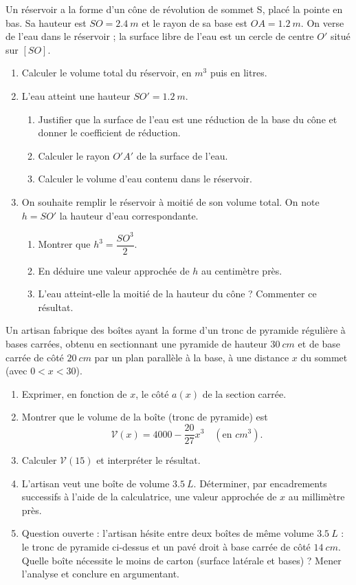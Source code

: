 \documentclass[11pt]{article}
\begin{document}
\begin{exercice}
Un réservoir a la forme d'un cône de révolution de sommet S, placé la pointe en bas. Sa hauteur est $SO = \SI{2,4}{m}$ et le rayon de sa base est $OA = \SI{1,2}{m}$. On verse de l'eau dans le réservoir ; la surface libre de l'eau est un cercle de centre $O'$ situé sur $[SO]$.
\begin{enumerate}
\item Calculer le volume total du réservoir, en $\si{m^3}$ puis en litres.
\item L'eau atteint une hauteur $SO' = \SI{1,2}{m}$.
\begin{enumerate}
\item Justifier que la surface de l'eau est une réduction de la base du cône et donner le coefficient de réduction.
\item Calculer le rayon $O'A'$ de la surface de l'eau.
\item Calculer le volume d'eau contenu dans le réservoir.
\end{enumerate}
\item On souhaite remplir le réservoir à moitié de son volume total. On note $h = SO'$ la hauteur d'eau correspondante.
\begin{enumerate}
\item Montrer que $h^3 = \dfrac{SO^3}{2}$.
\item En déduire une valeur approchée de $h$ au centimètre près.
\item L'eau atteint-elle la moitié de la hauteur du cône ? Commenter ce résultat.
\end{enumerate}
\end{enumerate}
\end{exercice}

\begin{exercice}
Un artisan fabrique des boîtes ayant la forme d'un tronc de pyramide régulière à bases carrées, obtenu en sectionnant une pyramide de hauteur $\SI{30}{cm}$ et de base carrée de côté $\SI{20}{cm}$ par un plan parallèle à la base, à une distance $x$ du sommet (avec $0 < x < 30$).
\begin{enumerate}
\item Exprimer, en fonction de $x$, le côté $a(x)$ de la section carrée.
\item Montrer que le volume de la boîte (tronc de pyramide) est
\[\mathcal{V}(x) = 4000 - \frac{20}{27}x^3 \quad (\text{en } \si{cm^3}).\]
\item Calculer $\mathcal{V}(15)$ et interpréter le résultat.
\item L'artisan veut une boîte de volume $\SI{3,5}{L}$. Déterminer, par encadrements successifs à l'aide de la calculatrice, une valeur approchée de $x$ au millimètre près.
\item Question ouverte : l'artisan hésite entre deux boîtes de même volume $\SI{3,5}{L}$ : le tronc de pyramide ci-dessus et un pavé droit à base carrée de côté $\SI{14}{cm}$. Quelle boîte nécessite le moins de carton (surface latérale et bases) ? Mener l'analyse et conclure en argumentant.
\end{enumerate}
\end{exercice}
\end{document}
